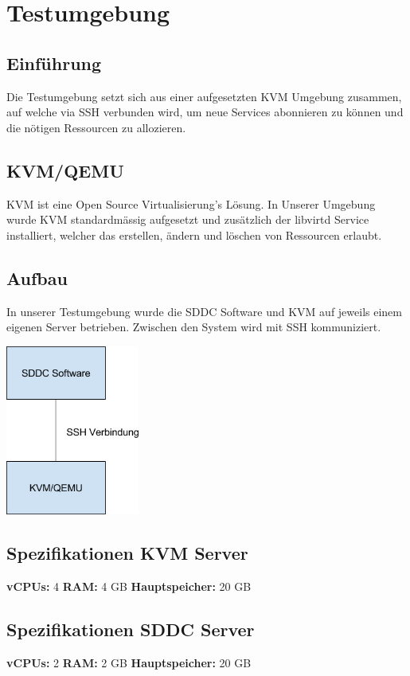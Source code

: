\chapter{Testumgebung}

\section{Einführung}

Die Testumgebung setzt sich aus einer aufgesetzten KVM Umgebung zusammen, auf 
welche via SSH verbunden wird, um neue Services abonnieren zu können und die 
nötigen Ressourcen zu allozieren.

\section{KVM/QEMU}

KVM ist eine Open Source Virtualisierung's Lösung.
In Unserer Umgebung wurde KVM standardmässig aufgesetzt und zusätzlich der 
libvirtd Service installiert, welcher das erstellen, ändern und löschen von 
Ressourcen erlaubt.

\section{Aufbau}

In unserer Testumgebung wurde die SDDC Software und KVM auf jeweils einem eigenen Server betrieben.
Zwischen den System wird mit SSH kommuniziert.
\begin{center}
\includegraphics[width=0.33\textwidth]{./12_Appendix/images/kvm}
\end{center}

\section{Spezifikationen KVM Server}

\textbf{vCPUs:} 4
\textbf{RAM:} 4 GB
\textbf{Hauptspeicher:} 20 GB

\section{Spezifikationen SDDC Server}

\textbf{vCPUs:} 2
\textbf{RAM:} 2 GB
\textbf{Hauptspeicher:} 20 GB